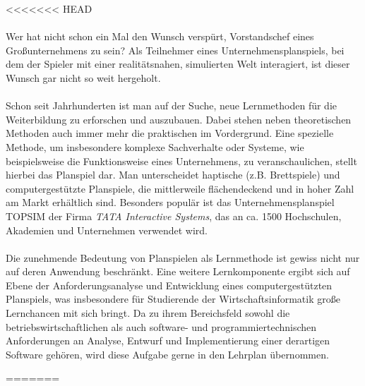 <<<<<<< HEAD
\\
\\
Wer hat nicht schon ein Mal den Wunsch verspürt, Vorstandschef eines Großunternehmens zu sein? 
Als Teilnehmer eines Unternehmensplanspiels, bei dem der Spieler mit  einer realitätsnahen, simulierten Welt interagiert, ist dieser Wunsch gar nicht so weit hergeholt. 
\\
\\
Schon seit Jahrhunderten ist man auf der Suche, neue Lernmethoden für die Weiterbildung zu erforschen und auszubauen. Dabei stehen neben theoretischen Methoden auch immer mehr die praktischen im Vordergrund.  Eine spezielle Methode, um insbesondere komplexe Sachverhalte oder Systeme, wie beispielsweise die Funktionsweise eines Unternehmens, zu veranschaulichen, stellt hierbei das Planspiel dar. Man unterscheidet haptische (z.B. Brettspiele) und computergestützte Planspiele, die mittlerweile flächendeckend und in hoher Zahl am Markt erhältlich sind. Besonders populär ist das Unternehmensplanspiel TOPSIM der Firma \textit{TATA Interactive Systems}, das an ca. 1500 Hochschulen, Akademien und Unternehmen verwendet wird.
\\
\\
Die zunehmende Bedeutung von Planspielen als Lernmethode ist gewiss nicht nur auf deren Anwendung beschränkt. Eine weitere Lernkomponente ergibt sich auf Ebene der Anforderungsanalyse und Entwicklung eines computergestützten Planspiels, was insbesondere für Studierende der Wirtschaftsinformatik große Lernchancen mit sich bringt. Da zu ihrem Bereichsfeld sowohl die betriebswirtschaftlichen als auch software- und programmiertechnischen Anforderungen an Analyse, Entwurf und Implementierung einer derartigen Software gehören, wird diese Aufgabe gerne in den Lehrplan übernommen. 

\autorende{}

=======

